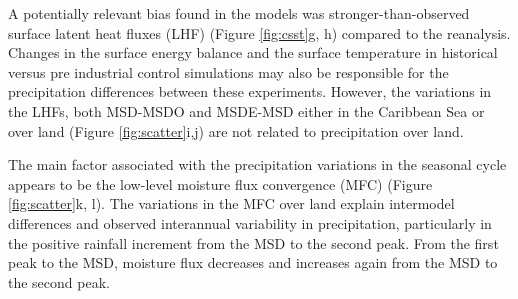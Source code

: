 A potentially relevant bias found in the models was stronger-than-observed surface latent heat fluxes (LHF) (Figure \ref{fig:csst}g, h) compared to the reanalysis.  Changes in the surface energy balance and the surface temperature in historical versus pre industrial control simulations may also be responsible for the precipitation differences between these experiments.  However, the variations in the LHFs, both MSD-MSDO and MSDE-MSD either in the Caribbean Sea or over land (Figure \ref{fig:scatter}i,j) are not related to precipitation over land.



The main factor associated with the precipitation variations in the seasonal cycle appears to be the low-level moisture flux convergence (MFC) (Figure \ref{fig:scatter}k, l). The variations in the MFC over land explain intermodel differences and observed interannual variability in precipitation, particularly in the positive rainfall increment from the MSD to the second peak. From the first peak to the MSD, moisture flux decreases and increases again from the MSD to the second peak. %
 
